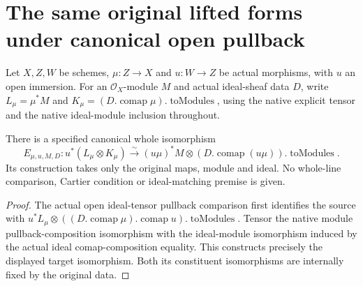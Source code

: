 \section{The same original lifted forms under canonical open pullback}

Let $X,Z,W$ be schemes, $\mu:Z\to X$ and $u:W\to Z$ be actual morphisms,
with $u$ an open immersion. For an $\mathcal O_X$-module $M$ and actual
ideal-sheaf data $D$, write $L_\mu=\mu^*M$ and
$K_\mu=(D.\operatorname{comap}\mu).\operatorname{toModules}$, using the
native explicit tensor and the native ideal-module inclusion throughout.

\begin{definition}
\label{def:resume-original-whole-open-target-comparison}
\leanok
There is a specified canonical whole isomorphism
\[
 E_{\mu,u,M,D}:u^*(L_\mu\otimes K_\mu)
 \xrightarrow{\sim}(u\mu)^*M\otimes
 (D.\operatorname{comap}(u\mu)).\operatorname{toModules}.
\]
Its construction takes only the original maps, module and ideal. No
whole-line comparison, Cartier condition or ideal-matching premise is given.
\end{definition}
\begin{proof}
The actual open ideal-tensor pullback comparison first identifies the source
with $u^*L_\mu\otimes
((D.\operatorname{comap}\mu).\operatorname{comap}u).\operatorname{toModules}$.
Tensor the native module pullback-composition isomorphism with the ideal-module
isomorphism induced by the actual ideal comap-composition equality. This
constructs precisely the displayed target isomorphism. Both its constituent
isomorphisms are internally fixed by the original data.
\end{proof}

